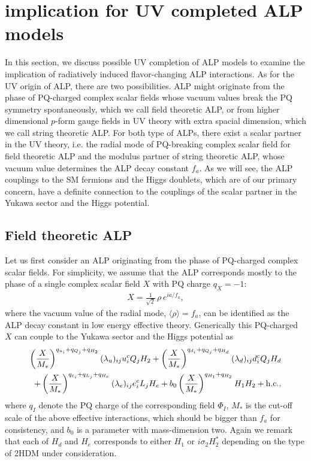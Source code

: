 \documentclass[preprint,prd,aps,tighten,nofootinbib,amssymb]{revtex4}
\newcommand{\bea}{\begin{eqnarray}}
\newcommand{\eea}{\end{eqnarray}}
\def\vpq{f_{a}}
\begin{document}
\section{implication for UV completed ALP models} \label{sec:UVsupp}

In this section, we discuss possible UV completion of ALP models to examine the implication of radiatively induced flavor-changing ALP interactions. 
As for the UV origin of ALP, there are two possibilities. ALP might originate from the phase of PQ-charged complex scalar fields whose vacuum values break the PQ symmetry  spontaneously, which we call  field theoretic ALP, or from higher dimensional $p$-form gauge fields in UV theory with extra spacial dimension, which we call string theoretic ALP.
For both type of ALPs, there exist a scalar partner in the UV theory, i.e. the radial mode of PQ-breaking complex scalar field for field theoretic ALP  and the modulus partner of string theoretic ALP, whose vacuum value determines the ALP decay constant $\vpq$.
As we will see, the ALP couplings to the SM fermions and the Higgs doublets, which are of our primary concern,  have a definite connection to the couplings of the scalar partner in the Yukawa sector and the Higgs potential.

\subsection{Field theoretic ALP}

Let us first consider an ALP originating from the phase of PQ-charged complex scalar fields.
For simplicity, we assume  that the ALP corresponds mostly to the phase of a single complex scalar field $X$ with PQ charge $q_X=-1$:
\bea
X = \frac{1}{\sqrt{2}}\, \rho\, e^{ia/\vpq},
\eea
where the vacuum value of the radial mode,  $\langle\rho\rangle=\vpq$, can be identified as the ALP decay constant in low energy effective theory.
Generically this PQ-charged $X$ can couple to the Yukawa sector and the Higgs potential as 
\bea
\label{yukawa_uv}
\left(\frac{X}{M_*}\right)^{q_{u_i}+q_{Q_j}+q_{H_2}}(\lambda_u)_{ij}{u}^c_{i}  Q_{j} H_2 +  \left(\frac{X}{M_*}\right)^{q_{d_i}+q_{Q_j}+q_{H_d}} (\lambda_d)_{ij} {d}^c_{i} Q_{j} H_d \nonumber \\
 +  \left(\frac{X}{M_*}\right)^{q_{e_i}+q_{L_j}+q_{H_e}} (\lambda_e)_{ij}{e}^c_{i}  L_j H_e  +
  b_0 \left(\frac{X}{M_*}\right)^{q_{H_1}+q_{H_2}} H_1 H_2 + {\rm h.c.},
\eea
where $q_I$ denote the PQ charge of the corresponding field $\Phi_I$, $M_*$ is the cut-off scale of the above effective interactions, which should be bigger than $f_a$ for consistency, and $b_0$ is a  parameter with mass-dimension two. 
Again we remark that each of $H_d$ and $H_e$ corresponds to either $H_1$ or $i \sigma_2 H_2^*$ depending on the type of 2HDM under consideration.
\end{document}
